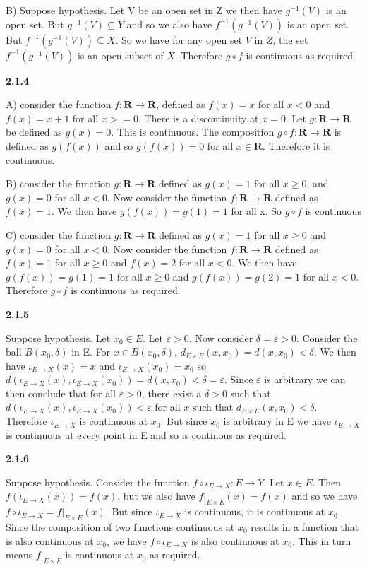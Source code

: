 \documentclass[12pt]{article}
\begin{document}
B) Suppose hypothesis. Let V be an open set in Z we then have $ g^{-1}(V)$ is an open set. But $ g^{-1}(V)\subseteq Y$ and so we also have $f^{-1}(g^{-1}(V))$ is an open set. But $f^{-1}(g^{-1}(V))\subseteq X$. So we have for any open set $V$ in $Z$, the set $f^{-1}(g^{-1}(V))$ is an open subset of $X$. Therefore $g \circ f$ is continuous as required. 

\textbf{2.1.4}

A) consider the function $f:\textbf{R}\to \textbf{R}$, defined as $f(x) = x$ for all $x<0$ and $f(x) = x+1$ for all $x>= 0$. There is a discontinuity at $x=0$. Let $g:\textbf{R}\to\textbf{R}$ be defined as $g(x)=0$. This is continuous. The composition $g\circ f: \textbf{R}\to \textbf{R}$ is defined as $g(f(x))$ and so $g(f(x)) = 0$ for all $x\in \textbf{R}$. Therefore it is continuous. 

B) consider the function $g:\textbf{R}\to \textbf{R}$ defined as $g(x) = 1$ for all $x\geq 0$, and $g(x) = 0$ for all $x<0$. Now consider the function $f:\textbf{R}\to \textbf{R}$ defined as $f(x) = 1$. We then have $g(f(x)) = g(1) = 1$ for all x. So $g\circ f$ is continuous

C) consider the function $g:\textbf{R}\to \textbf{R}$ defined as $g(x) = 1$ for all $x\geq 0$ and $g(x) = 0$ for all $x<0$. Now consider the function $f:\textbf{R}\to \textbf{R}$ defined as $f(x) = 1$ for all $x\geq 0$ and $f(x) = 2$ for all $x<0$. We then have $g(f(x)) = g(1) = 1$ for all $x\geq 0$ and $ g(f(x)) = g(2) = 1$ for all $x< 0$. Therefore $g\circ f$ is continuous as required.

\textbf{2.1.5}

Suppose hypothesis. Let $x_0 \in E$. Let $\varepsilon >0$. Now consider $\delta = \varepsilon>0$. Consider the ball $B(x_0,\delta)$ in E. For $x\in B(x_0,\delta)$, $d_{E\times E}(x,x_0) = d(x,x_0)< \delta$. We then have $\iota_{E\to X}(x) = x$ and $\iota_{E\to X}(x_0) = x_0$ so $d(\iota_{E\to X}(x),\iota_{E\to X}(x_0)) = d(x,x_0) < \delta = \varepsilon$. Since $\varepsilon$ is arbitrary we can then conclude that for all $\varepsilon>0$, there exist a $\delta>0$ such that $d(\iota_{E\to X}(x),\iota_{E\to X}(x_0))< \varepsilon$ for all $x$ such that $d_{E\times E}(x,x_0)<\delta$. Therefore $\iota_{E\to X}$ is continuous at  $x_0$. But since $x_0$ is arbitrary in E we have $\iota_{E\to X}$ is continuous at every point in E and so is continous as required.

\textbf{2.1.6}

Suppose hypothesis. Consider the function $f\circ \iota_{E\to X}:E\to Y$. Let $x\in E$. Then $f(\iota_{E\to X}(x)) = f(x)$, but we also have $f|_{E\times E}(x) = f(x)$ and so we have $f\circ \iota_{E\to X} = f|_{E\times E}(x)$. But since $\iota_{E\to X}$ is continuous, it is continuous at $x_0$. Since the composition of two functions continuous at $x_0$ results in a function that is also continuous at $x_0$, we have $f\circ \iota_{E\to X}$ is also continuous at $x_0$. This in turn means $f|_{E\times E}$ is continuous at $x_0$ as required.
\end{document}
